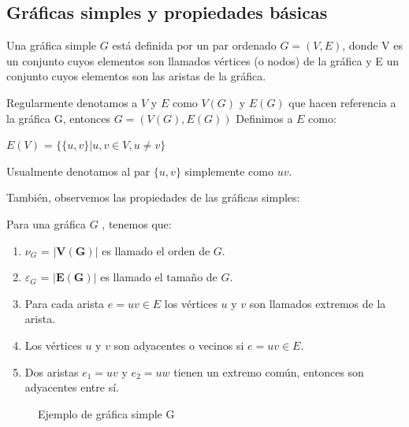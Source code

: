\subsection{Gráficas simples y propiedades básicas}

\begin{definition} 
Una gráfica simple $G$ está definida por un par ordenado $G = (V,E)$, donde V es un conjunto cuyos elementos son llamados vértices (o nodos) de la gráfica y E un conjunto cuyos elementos son las aristas de la gráfica. 
\end{definition}

\noindent Regularmente denotamos a $V$ y $E$ como $V(G)$ y $E(G)$ que hacen referencia a la gráfica G, entonces $G=(V(G),E(G))$
Definimos a $E$ como:
\begin{center}
$E(V)$ = $\{\{u,v\} | u,v \in V, u \neq v \}$
\end{center}
Usualmente denotamos al par $\{u,v\}$ simplemente como $uv$.

También, observemos las propiedades de las gráficas simples:

\begin{definition} 
Para una gráfica $G$ , tenemos que:
\begin{enumerate}
    \item $\nu_{G}$ = $|\mathbf{V(G)}|$ es llamado el orden de $G$.
    \item $\varepsilon_{G}$ = $|\mathbf{E(G)}|$ es llamado  el tamaño de $G$.
    \item Para cada arista $e = uv \in E$ los vértices $u$ y $v$ son llamados extremos de la arista.
    \item Los vértices $u$ y $v$ son adyacentes o vecinos si $e = uv \in E$.
    \item Dos aristas $e_1 = uv$ y $e_2 = uw$ tienen un extremo común, entonces son adyacentes entre sí.
\end{enumerate}
\end{definition}

\begin{center}
\begin{figure}[H]
    \centering
    \caption{Ejemplo de gráfica simple G}
    \label{fig:G}
\end{figure}
\end{center}

